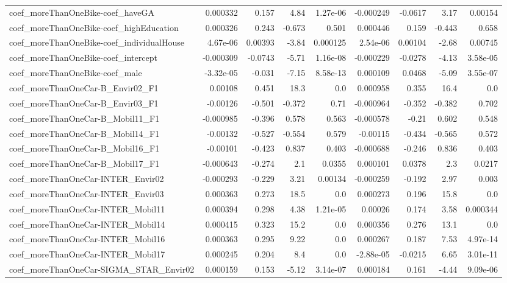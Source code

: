 \begin{tabular}{lrrrrrrrr}
coef_moreThanOneBike-coef_haveGA & 0.000332 & 0.157 & 4.84 & 1.27e-06 & -0.000249 & -0.0617 & 3.17 & 0.00154 \\
coef_moreThanOneBike-coef_highEducation & 0.000326 & 0.243 & -0.673 & 0.501 & 0.000446 & 0.159 & -0.443 & 0.658 \\
coef_moreThanOneBike-coef_individualHouse & 4.67e-06 & 0.00393 & -3.84 & 0.000125 & 2.54e-06 & 0.00104 & -2.68 & 0.00745 \\
coef_moreThanOneBike-coef_intercept & -0.000309 & -0.0743 & -5.71 & 1.16e-08 & -0.000229 & -0.0278 & -4.13 & 3.58e-05 \\
coef_moreThanOneBike-coef_male & -3.32e-05 & -0.031 & -7.15 & 8.58e-13 & 0.000109 & 0.0468 & -5.09 & 3.55e-07 \\
coef_moreThanOneCar-B_Envir02_F1 & 0.00108 & 0.451 & 18.3 & 0.0 & 0.000958 & 0.355 & 16.4 & 0.0 \\
coef_moreThanOneCar-B_Envir03_F1 & -0.00126 & -0.501 & -0.372 & 0.71 & -0.000964 & -0.352 & -0.382 & 0.702 \\
coef_moreThanOneCar-B_Mobil11_F1 & -0.000985 & -0.396 & 0.578 & 0.563 & -0.000578 & -0.21 & 0.602 & 0.548 \\
coef_moreThanOneCar-B_Mobil14_F1 & -0.00132 & -0.527 & -0.554 & 0.579 & -0.00115 & -0.434 & -0.565 & 0.572 \\
coef_moreThanOneCar-B_Mobil16_F1 & -0.00101 & -0.423 & 0.837 & 0.403 & -0.000688 & -0.246 & 0.836 & 0.403 \\
coef_moreThanOneCar-B_Mobil17_F1 & -0.000643 & -0.274 & 2.1 & 0.0355 & 0.000101 & 0.0378 & 2.3 & 0.0217 \\
coef_moreThanOneCar-INTER_Envir02 & -0.000293 & -0.229 & 3.21 & 0.00134 & -0.000259 & -0.192 & 2.97 & 0.003 \\
coef_moreThanOneCar-INTER_Envir03 & 0.000363 & 0.273 & 18.5 & 0.0 & 0.000273 & 0.196 & 15.8 & 0.0 \\
coef_moreThanOneCar-INTER_Mobil11 & 0.000394 & 0.298 & 4.38 & 1.21e-05 & 0.00026 & 0.174 & 3.58 & 0.000344 \\
coef_moreThanOneCar-INTER_Mobil14 & 0.000415 & 0.323 & 15.2 & 0.0 & 0.000356 & 0.276 & 13.1 & 0.0 \\
coef_moreThanOneCar-INTER_Mobil16 & 0.000363 & 0.295 & 9.22 & 0.0 & 0.000267 & 0.187 & 7.53 & 4.97e-14 \\
coef_moreThanOneCar-INTER_Mobil17 & 0.000245 & 0.204 & 8.4 & 0.0 & -2.88e-05 & -0.0215 & 6.65 & 3.01e-11 \\
coef_moreThanOneCar-SIGMA_STAR_Envir02 & 0.000159 & 0.153 & -5.12 & 3.14e-07 & 0.000184 & 0.161 & -4.44 & 9.09e-06 \\

\end{tabular}
